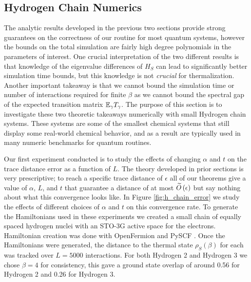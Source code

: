 \subsection{Hydrogen Chain Numerics} \label{sec:general_numerics}

The analytic results developed in the previous two sections provide strong guarantees on the correctness of our routine for most quantum systems, however the bounds on the total simulation are fairly high degree polynomials in the parameters of interest. One crucial interpretation of the two different results is that knowledge of the eigenvalue differences of $H_S$ can lead to significantly better simulation time bounds, but this knowledge is not \emph{crucial} for thermalization. Another important takeaway is that we cannot bound the simulation time or number of interactions required for finite $\beta$ as we cannot bound the spectral gap of the expected transition matrix $\mathbb{E}_\gamma T_\gamma$. The purpose of this section is to investigate these two theoretic takeaways numerically with small Hydrogen chain systems. These systems are some of the smallest chemical systems that still display some real-world chemical behavior, and as a result are typically used in many numeric benchmarks for quantum routines. 

Our first experiment conducted is to study the effects of changing $\alpha$ and $t$ on the trace distance error as a function of $L$. The theory developed in prior sections is very prescriptive; to reach a specific trace distance of $\epsilon$ all of our theorems give a value of $\alpha$, $L$, and $t$ that guarantee a distance of at most $\widetilde{O} \left( \epsilon \right)$ but say nothing about what this convergence looks like. In Figure \ref{fig:h_chain_error} we study the effects of different choices of $\alpha$ and $t$ on this convergence rate. To generate the Hamiltonians used in these experiments we created a small chain of equally spaced hydrogen nuclei with an STO-3G active space for the electrons. Hamiltonian creation was done with OpenFermion \cite{mcclean2020openfermion} and PySCF \cite{pyscf}. Once the Hamiltonians were generated, the distance to the thermal state $\rho_S(\beta)$ for each was tracked over $L = 5000$ interactions. For both Hydrogen 2 and Hydrogen 3 we chose $\beta = 4$ for consistency, this gave a ground state overlap of around 0.56 for Hydrogen 2 and 0.26 for Hydrogen 3. 

